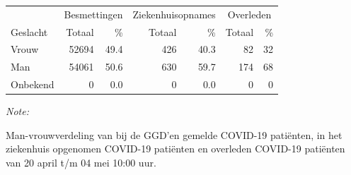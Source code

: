 \documentclass[
  english,
  man,floatsintext]{apa6}
\begin{document}
\begin{table}
\centering\begingroup\fontsize{11}{13}\selectfont

\begin{threeparttable}
\begin{tabular}{lrrrrrr}
\toprule
\multicolumn{1}{c}{ } & \multicolumn{2}{c}{Besmettingen} & \multicolumn{2}{c}{Ziekenhuisopnames} & \multicolumn{2}{c}{Overleden} \\
\cmidrule(l{3pt}r{3pt}){2-3} \cmidrule(l{3pt}r{3pt}){4-5} \cmidrule(l{3pt}r{3pt}){6-7}
Geslacht & Totaal & \% & Totaal & \% & Totaal & \%\\
\midrule
Vrouw & 52694 & 49.4 & 426 & 40.3 & 82 & 32\\
Man & 54061 & 50.6 & 630 & 59.7 & 174 & 68\\
Onbekend & 0 & 0.0 & 0 & 0.0 & 0 & 0\\
\bottomrule
\end{tabular}
\begin{tablenotes}
\item \textit{Note: } 
\item Man-vrouwverdeling van bij de GGD’en gemelde COVID-19 patiënten, in het ziekenhuis opgenomen COVID-19 patiënten en overleden COVID-19 patiënten van 20 april t/m 04 mei 10:00 uur.
\end{tablenotes}
\end{threeparttable}
\endgroup{}
\end{table}
\newpage
\end{document}
